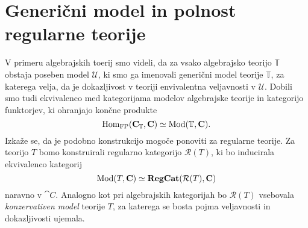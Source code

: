 \documentclass[../kategoricna_logika.tex]{subfiles}
\begin{document}
\section{Generični model in polnost regularne teorije}
V primeru algebrajskih toerij smo videli, da za vsako algebrajsko teorijo $\mathbb{T}$ obstaja poseben model $\mathcal{U}$,
ki smo ga imenovali generični model teorije $\mathbb{T}$, za katerega velja, da je dokazljivost v teoriji envivalentna veljavnosti v $\mathcal{U}$.
Dobili smo tudi ekvivalenco med kategorijama modelov algebrajske teorije in kategorijo funktorjev, ki ohranjajo končne produkte
$$\operatorname{Hom}_{\mathrm{FP}}({\operatorname{\mathbf{C}}}_{\mathbb{T}}, {\operatorname{\mathbf{C}}}) \simeq \operatorname{Mod}(\mathbb{T}, {\operatorname{\mathbf{C}}}).$$
Izkaže se, da je podobno konstrukcijo mogoče ponoviti za regularne teorije.
Za teorijo $T$ bomo konstruirali regularno kategorijo $\mathcal{R}(T)$, ki bo inducirala ekvivalenco kategorij
$$\operatorname{Mod}(T, {\operatorname{\mathbf{C}}}) \simeq {\operatorname{\mathbf{RegCat}}}(\mathcal{R}(T), {\operatorname{\mathbf{C}}})$$
naravno v $\cat{C}$. Analogno kot pri algebrajskih kategorijah bo $\mathcal{R}(T)$ vsebovala \emph{konzervativen model} teorije $T$,
za katerega se bosta pojma veljavnosti in dokazljivosti ujemala.
\end{document}
